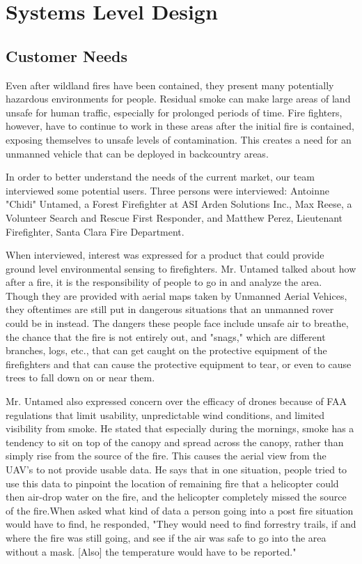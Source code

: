 \chapter{Systems Level Design}
\graphicspath{{images/}}
%
\section{Customer Needs }
Even after wildland fires have been contained, they present many potentially hazardous environments for people. Residual smoke can make large areas of land unsafe for human traffic, especially for prolonged periods of time. Fire fighters, however, have to continue to work in these areas after the initial fire is contained, exposing themselves to unsafe levels of contamination. This creates a need for an unmanned vehicle that can be deployed in backcountry areas. 

In order to better understand the needs of the current market, our team interviewed some potential users. Three persons were interviewed: Antoinne "Chidi" Untamed, a Forest Firefighter at ASI Arden Solutions Inc., Max Reese, a Volunteer Search and Rescue First Responder, and Matthew Perez, Lieutenant Firefighter, Santa Clara Fire Department. 

When interviewed, interest was expressed for a product that could provide ground level environmental sensing to firefighters. Mr. Untamed talked about how after a fire, it is the responsibility of people to go in and analyze the area. Though they are provided with aerial maps taken by Unmanned Aerial Vehices, they oftentimes are still put in dangerous situations that an unmanned rover could be in instead. The dangers these people face include unsafe air to breathe, the chance that the fire is not entirely out, and "snags," which are different branches, logs, etc., that can get caught on the protective equipment of the firefighters and that can cause the protective equipment to tear, or even to cause trees to fall down on or near them. 

Mr. Untamed also expressed concern over the efficacy of drones because of FAA regulations that limit usability, unpredictable wind conditions, and limited visibility from smoke. He stated that especially during the mornings, smoke has a tendency to sit on top of the canopy and spread across the canopy, rather than simply rise from the source of the fire. This causes the aerial view from the UAV's to not provide usable data. He says that in one situation, people tried to use this data to pinpoint the location of remaining fire that a helicopter could then air-drop water on the fire, and the helicopter completely missed the source of the fire.When asked what kind of data a person going into a post fire situation would have to find, he responded, "They would need to find forrestry trails, if and where the fire was still going, and see if the air was safe to go into the area without a mask. [Also] the temperature would have to be reported." 

